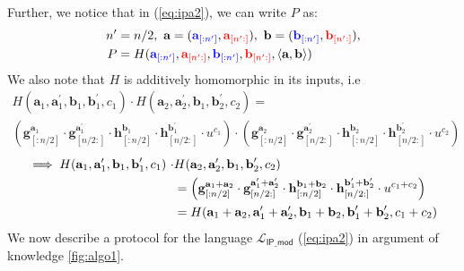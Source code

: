 Further, we notice that in (\ref{eq:ipa2}), we can write $P$ as: 
\begin{align*}
    n^{\prime}
    &=
    n/2, \ \textbf{a} = (\textcolor{blue}{\textbf{a}_{[:n^{\prime}]}}, \textcolor{red}{\textbf{a}_{[n^{\prime}:]}}),  \ \textbf{b} = (\textcolor{blue}{\textbf{b}_{[:n^{\prime}]}}, \textcolor{red}{\textbf{b}_{[n^{\prime}:]}}),\\
    P 
    &= 
    H(\textcolor{blue}{\textbf{a}_{[:n^{\prime}]}}, \textcolor{red}{\textbf{a}_{[n^{\prime}:]}}, 
    \textcolor{blue}{\textbf{b}_{[:n^{\prime}]}}, \textcolor{red}{\textbf{b}_{[n^{\prime}:]}}, \langle \textbf{a}, \textbf{b} \rangle)
\end{align*}
We also note that $H$ is additively homomorphic in its inputs, i.e
\begin{multline*}
    H(\textbf{a}_1, \textbf{a}_1^{\prime}, \textbf{b}_1, \textbf{b}_1^{\prime}, c_1)\cdot 
    H(\textbf{a}_2, \textbf{a}_2^{\prime}, \textbf{b}_1, \textbf{b}_2^{\prime}, c_2) 
    =\\ 
    \left(\textbf{g}_{[:n/2]}^{\textbf{a}_1} \cdot 
    \textbf{g}_{[n/2:]}^{\textbf{a}_1^{\prime}}\cdot
    \textbf{h}_{[:n/2]}^{\textbf{b}_1} \cdot 
    \textbf{h}_{[n/2:]}^{\textbf{b}_1^{\prime}}\cdot
    u^{c_1}\right)\cdot
    \left(\textbf{g}_{[:n/2]}^{\textbf{a}_2} \cdot 
    \textbf{g}_{[n/2:]}^{\textbf{a}_2^{\prime}}\cdot
    \textbf{h}_{[:n/2]}^{\textbf{b}_2} \cdot 
    \textbf{h}_{[n/2:]}^{\textbf{b}_2^{\prime}}\cdot
    u^{c_2}\right)
\end{multline*}
\begin{align*}
\implies
    H(\textbf{a}_1, \textbf{a}_1^{\prime}, \textbf{b}_1, \textbf{b}_1^{\prime}, c_1) \ \cdot
    &
    H(\textbf{a}_2, \textbf{a}_2^{\prime}, \textbf{b}_1, \textbf{b}_2^{\prime}, c_2)\\ \vspace{10mm}
    &=
    \left(\textbf{g}_{[:n/2]}^{\textbf{a}_1 + \textbf{a}_2} \cdot 
    \textbf{g}_{[n/2:]}^{\textbf{a}_1^{\prime} + \textbf{a}_2^{\prime}}\cdot
    \textbf{h}_{[:n/2]}^{\textbf{b}_1 + \textbf{b}_2} \cdot 
    \textbf{h}_{[n/2:]}^{\textbf{b}_1^{\prime} + \textbf{b}_2^{\prime}}\cdot
    u^{c_1+c_2}\right)\\\vspace{10mm}
    &=
    H(\textbf{a}_1+\textbf{a}_2, \textbf{a}_1^{\prime} + \textbf{a}_2^{\prime}, \textbf{b}_1+\textbf{b}_2, \textbf{b}_1^{\prime} + \textbf{b}_2^{\prime}, c_1+c_2)
\end{align*}
We now describe a protocol for the language $\mathcal{L}_{\textsf{IP\_mod}}$ (\ref{eq:ipa2}) in argument of knowledge \ref{fig:algo1}.

